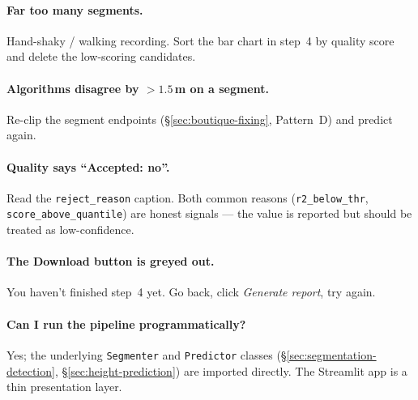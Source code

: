 \paragraph{Far too many segments.} Hand-shaky / walking recording.
Sort the bar chart in step~4 by quality score and delete the
low-scoring candidates.

\paragraph{Algorithms disagree by $>1.5$\,m on a segment.}
Re-clip the segment endpoints (\S\ref{sec:boutique-fixing},
Pattern~D) and predict again.

\paragraph{Quality says ``Accepted: no''.} Read the
\texttt{reject\_reason} caption. Both common reasons
(\texttt{r2\_below\_thr}, \texttt{score\_above\_quantile}) are
honest signals --- the value is reported but should be treated as
low-confidence.

\paragraph{The Download button is greyed out.} You haven't
finished step~4 yet. Go back, click \emph{Generate report},
try again.

\paragraph{Can I run the pipeline programmatically?} Yes; the
underlying \texttt{Segmenter} and \texttt{Predictor} classes
(\S\ref{sec:segmentation-detection},
\S\ref{sec:height-prediction}) are imported directly. The
Streamlit app is a thin presentation layer.
